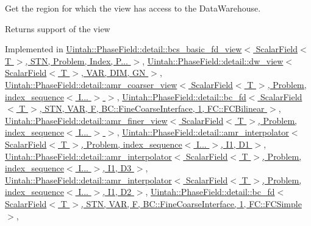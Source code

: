 Get the region for which the view has access to the Data\+Warehouse. 

\begin{DoxyReturn}{Returns}
support of the view 
\end{DoxyReturn}


Implemented in \hyperlink{classUintah_1_1PhaseField_1_1detail_1_1bcs__basic__fd__view_3_01ScalarField_3_01T_01_4_00_01STN_07caa9955adf783da0505eac75e76f08_a64c502e452847bd6bbfa26e6584bd64b}{Uintah\+::\+Phase\+Field\+::detail\+::bcs\+\_\+basic\+\_\+fd\+\_\+view$<$ Scalar\+Field$<$ T $>$, S\+T\+N, Problem, Index, P... $>$}, \hyperlink{classUintah_1_1PhaseField_1_1detail_1_1dw__view_3_01ScalarField_3_01T_01_4_00_01VAR_00_01DIM_00_01GN_01_4_a318a539e7857de7ba1271e7bb0ac9437}{Uintah\+::\+Phase\+Field\+::detail\+::dw\+\_\+view$<$ Scalar\+Field$<$ T $>$, V\+A\+R, D\+I\+M, G\+N $>$}, \hyperlink{classUintah_1_1PhaseField_1_1detail_1_1amr__coarser__view_3_01ScalarField_3_01T_01_4_00_01Proble9cadea116dab5bdb44bb3e29abbe99ef_a783d09b56009a7b0bcb0eb981c49a710}{Uintah\+::\+Phase\+Field\+::detail\+::amr\+\_\+coarser\+\_\+view$<$ Scalar\+Field$<$ T $>$, Problem, index\+\_\+sequence$<$ I... $>$ $>$}, \hyperlink{classUintah_1_1PhaseField_1_1detail_1_1bc__fd_3_01ScalarField_3_01T_01_4_00_01STN_00_01VAR_00_01bd5f5aa94f34afad5c8a785ee391ed2b_ad3c31d73b4d4e1d7327b7f6634158af5}{Uintah\+::\+Phase\+Field\+::detail\+::bc\+\_\+fd$<$ Scalar\+Field$<$ T $>$, S\+T\+N, V\+A\+R, F, B\+C\+::\+Fine\+Coarse\+Interface, 1, F\+C\+::\+F\+C\+Bilinear $>$}, \hyperlink{classUintah_1_1PhaseField_1_1detail_1_1amr__finer__view_3_01ScalarField_3_01T_01_4_00_01Problem_810ae3f886a4d3bdb2b37c629369a2ec_adfbb25e7253411ffab2a2bc035e87a6b}{Uintah\+::\+Phase\+Field\+::detail\+::amr\+\_\+finer\+\_\+view$<$ Scalar\+Field$<$ T $>$, Problem, index\+\_\+sequence$<$ I... $>$ $>$}, \hyperlink{classUintah_1_1PhaseField_1_1detail_1_1amr__interpolator_3_01ScalarField_3_01T_01_4_00_01Problem71844444bc14a03c0566689b6b502040_aab5b3fae360fb157ff3a6cba940f0db2}{Uintah\+::\+Phase\+Field\+::detail\+::amr\+\_\+interpolator$<$ Scalar\+Field$<$ T $>$, Problem, index\+\_\+sequence$<$ I... $>$, I1, D1 $>$}, \hyperlink{classUintah_1_1PhaseField_1_1detail_1_1amr__interpolator_3_01ScalarField_3_01T_01_4_00_01Problemdf68628a6010a1e1526666730125c372_ac5fa7533900896ba125401671a5739d2}{Uintah\+::\+Phase\+Field\+::detail\+::amr\+\_\+interpolator$<$ Scalar\+Field$<$ T $>$, Problem, index\+\_\+sequence$<$ I... $>$, I1, D3 $>$}, \hyperlink{classUintah_1_1PhaseField_1_1detail_1_1amr__interpolator_3_01ScalarField_3_01T_01_4_00_01Problemd2db9de1754b5450c93c191a9275f5ed_a62fab5a21bbdb676abc26812e2935b43}{Uintah\+::\+Phase\+Field\+::detail\+::amr\+\_\+interpolator$<$ Scalar\+Field$<$ T $>$, Problem, index\+\_\+sequence$<$ I... $>$, I1, D2 $>$}, \hyperlink{classUintah_1_1PhaseField_1_1detail_1_1bc__fd_3_01ScalarField_3_01T_01_4_00_01STN_00_01VAR_00_01ce55d0bf8381798bc129da931b626e80_a5538ce862e91e70376369ad7f4b17ba1}{Uintah\+::\+Phase\+Field\+::detail\+::bc\+\_\+fd$<$ Scalar\+Field$<$ T $>$, S\+T\+N, V\+A\+R, F, B\+C\+::\+Fine\+Coarse\+Interface, 1, F\+C\+::\+F\+C\+Simple $>$}, 